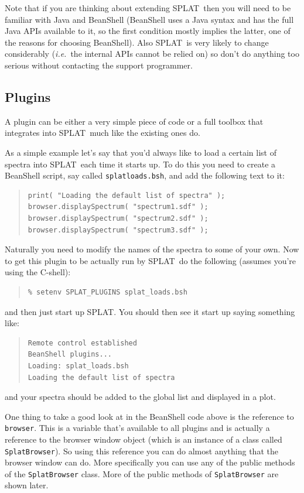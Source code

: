 \documentclass[twoside,11pt]{article}
\renewcommand{\_}{\texttt{\symbol{95}}}
\newcommand{\SPLAT}{\textsf{SPLAT}}
\newcommand{\hitext}[1]{\texttt{#1}}
\newcommand{\ie}{\textit{i.e.}}
\begin{document}
Note that if you are thinking about extending \SPLAT\ then you will
need to be familiar with Java and BeanShell (BeanShell uses a Java
syntax and has the full Java APIs available to it, so the first
condition mostly implies the latter, one of the reasons for choosing
BeanShell). Also \SPLAT\ is very likely to change considerably (\ie\
the internal APIs cannot be relied on) so don't do anything too
serious without contacting the support programmer.

\subsection{Plugins}

A plugin can be either a very simple piece of code or a full toolbox
that integrates into \SPLAT\ much like the existing ones do.

As a simple example let's say that you'd always like to load a certain
list of spectra into \SPLAT\ each time it starts up. To do this you
need to create a BeanShell script, say called
\hitext{splat\_loads.bsh}, and add the following text to it:
\begin{quote}
\begin{verbatim}
print( "Loading the default list of spectra" );
browser.displaySpectrum( "spectrum1.sdf" );
browser.displaySpectrum( "spectrum2.sdf" );
browser.displaySpectrum( "spectrum3.sdf" );
\end{verbatim}
\end{quote}
Naturally you need to modify the names of the spectra to some of your
own. Now to get this plugin to be actually run by \SPLAT\ do the
following (assumes you're using the C-shell):
\begin{quote}
\begin{verbatim}
% setenv SPLAT_PLUGINS splat_loads.bsh
\end{verbatim}
\end{quote}
and then just start up \SPLAT. You should then see it start up saying
something like:
\begin{quote}
\begin{verbatim}
Remote control established
BeanShell plugins...
Loading: splat_loads.bsh
Loading the default list of spectra
\end{verbatim}
\end{quote}
and your spectra should be added to the global list and displayed in a
plot.

One thing to take a good look at in the BeanShell code above is the
reference to \hitext{browser}. This is a variable that's available to
all plugins and is actually a reference to the browser window object
(which is an instance of a class called \hitext{SplatBrowser}). So
using this reference you can do almost anything that the browser
window can do. More specifically you can use any of the public methods
of the \hitext{SplatBrowser} class. More of the public methods of
\hitext{SplatBrowser} are shown later.
\end{document}
